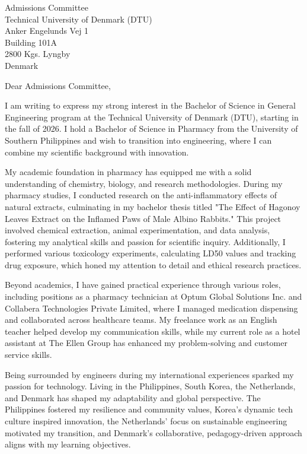 \documentclass[11pt,a4paper]{letter}
\date{February 22, 2026}
\begin{document}
\begin{letter}{Admissions Committee \\ Technical University of Denmark (DTU) \\ Anker Engelunds Vej 1 \\ Building 101A \\ 2800 Kgs. Lyngby \\ Denmark}

\opening{Dear Admissions Committee,}

I am writing to express my strong interest in the Bachelor of Science in General Engineering program at the Technical University of Denmark (DTU), starting in the fall of 2026. I hold a Bachelor of Science in Pharmacy from the University of Southern Philippines and wish to transition into engineering, where I can combine my scientific background with innovation.

My academic foundation in pharmacy has equipped me with a solid understanding of chemistry, biology, and research methodologies. During my pharmacy studies, I conducted research on the anti-inflammatory effects of natural extracts, culminating in my bachelor thesis titled "The Effect of Hagonoy Leaves Extract on the Inflamed Paws of Male Albino Rabbits." This project involved chemical extraction, animal experimentation, and data analysis, fostering my analytical skills and passion for scientific inquiry. Additionally, I performed various toxicology experiments, calculating LD50 values and tracking drug exposure, which honed my attention to detail and ethical research practices.

Beyond academics, I have gained practical experience through various roles, including positions as a pharmacy technician at Optum Global Solutions Inc. and Collabera Technologies Private Limited, where I managed medication dispensing and collaborated across healthcare teams. My freelance work as an English teacher helped develop my communication skills, while my current role as a hotel assistant at The Ellen Group has enhanced my problem-solving and customer service skills.

Being surrounded by engineers during my international experiences sparked my passion for technology. Living in the Philippines, South Korea, the Netherlands, and Denmark has shaped my adaptability and global perspective. The Philippines fostered my resilience and community values, Korea's dynamic tech culture inspired innovation, the Netherlands' focus on sustainable engineering motivated my transition, and Denmark's collaborative, pedagogy-driven approach aligns with my learning objectives.


\end{letter}
\end{document}
